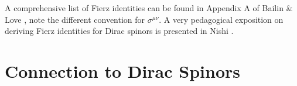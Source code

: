 \documentclass[12pt]{article}
\numberwithin{equation}{section}    %
\begin{document}
% 
% 
% 

A comprehensive list of Fierz identities can be found in Appendix A of Bailin \& Love \cite{Bailin:1994qt}, note the different convention for $\sigma^{\mu\nu}$. A very pedagogical exposition on deriving Fierz identities for Dirac spinors is presented in Nishi \cite{nishi:1160}. 

\section{Connection to Dirac Spinors}\label{subsec:SUSYalg:DiracSpinors}
\end{document}
